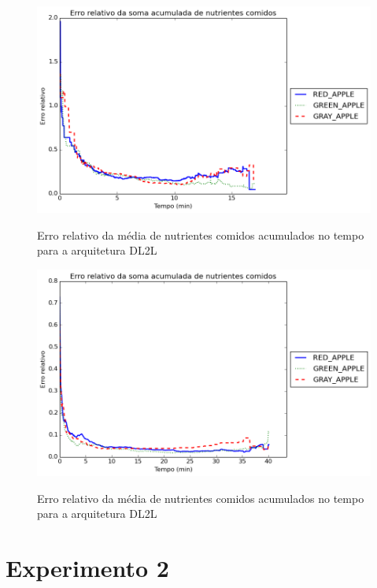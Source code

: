 \begin{apendicesenv}
\begin{figure}[H]
    \centering
    \caption{Erro relativo da média de nutrientes comidos acumulados no tempo para a arquitetura DL2L}
    \includegraphics[scale=0.6]{04-figuras/experiments/exp_1_artifice/accumulatedNutrients_err.png}
    \label{fig:accNutrients_artifice_err}
\end{figure}

\begin{figure}[H]
    \centering
    \caption{Erro relativo da média de nutrientes comidos acumulados no tempo para a arquitetura DL2L}
    \includegraphics[scale=0.6]{04-figuras/experiments/exp_1_l2l/accumulatedNutrients_err.png}
    \label{fig:accNutrients_dl2l_err}
\end{figure}


\section{Experimento 2}
\label{ap:erroExp2}


\end{apendicesenv}
